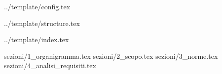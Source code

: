  {../template/config.tex}


\def\DOCUMENTO{Relazione}
\def\VERSIONE{1.0.0}

\def\DESCRIZIONE{<Info documento>}

\def\REDATTORE {Francesco Bizzaro\\ & Gino Zaidan}
\def\VERIFICATORE {Luca Finotello\\ & Stefano Scaglione}
\def\RESPONSABILE {Bizzaro Francesco}

\def\USO {Interno}

\def\DISTRIBUZIONE {\GRUPPO{}\\ & \COMMITTENTE{}\\}

\def\DESCRIZIONE {Relazione del progetto \textit{\PROGETTO}, realizzato per il corso di \textit{tecnologie web} dal gruppo \GRUPPO}


\def\INDICE	{true}
\def\TABELLE {false}
\def\FIGURE {false}


 {../template/structure.tex}


 {../template/index.tex}

 {sezioni/1_organigramma.tex}
 {sezioni/2_scopo.tex}
 {sezioni/3_norme.tex}
 {sezioni/4_analisi_requisiti.tex}






